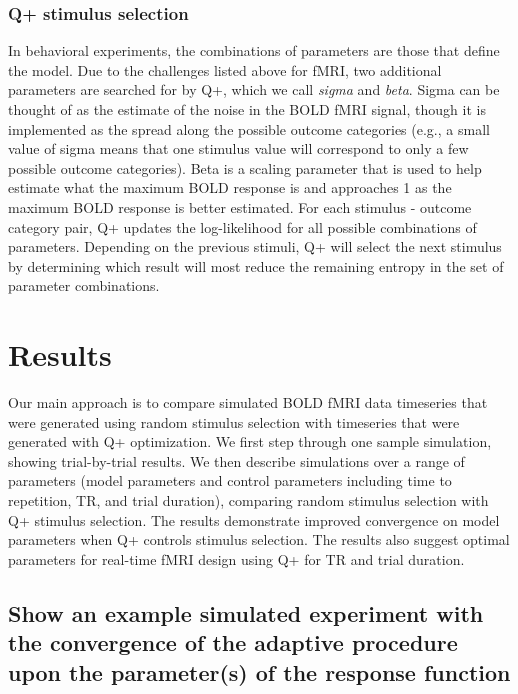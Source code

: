 \documentclass[
  man,floatsintext]{apa6}
\begin{document}
\hypertarget{q-stimulus-selection}{%
\subsubsection{Q+ stimulus selection}\label{q-stimulus-selection}}

In behavioral experiments, the combinations of parameters are those that define the model. Due to the challenges listed above for fMRI, two additional parameters are searched for by Q+, which we call \emph{sigma} and \emph{beta}. Sigma can be thought of as the estimate of the noise in the BOLD fMRI signal, though it is implemented as the spread along the possible outcome categories (e.g., a small value of sigma means that one stimulus value will correspond to only a few possible outcome categories). Beta is a scaling parameter that is used to help estimate what the maximum BOLD response is and approaches 1 as the maximum BOLD response is better estimated.
For each stimulus - outcome category pair, Q+ updates the log-likelihood for all possible combinations of parameters. Depending on the previous stimuli, Q+ will select the next stimulus by determining which result will most reduce the remaining entropy in the set of parameter combinations.

\hypertarget{results}{%
\section{Results}\label{results}}

Our main approach is to compare simulated BOLD fMRI data timeseries that were generated using random stimulus selection with timeseries that were generated with Q+ optimization. We first step through one sample simulation, showing trial-by-trial results. We then describe simulations over a range of parameters (model parameters and control parameters including time to repetition, TR, and trial duration), comparing random stimulus selection with Q+ stimulus selection. The results demonstrate improved convergence on model parameters when Q+ controls stimulus selection. The results also suggest optimal parameters for real-time fMRI design using Q+ for TR and trial duration.

\hypertarget{show-an-example-simulated-experiment-with-the-convergence-of-the-adaptive-procedure-upon-the-parameters-of-the-response-function}{%
\subsection{Show an example simulated experiment with the convergence of the adaptive procedure upon the parameter(s) of the response function}\label{show-an-example-simulated-experiment-with-the-convergence-of-the-adaptive-procedure-upon-the-parameters-of-the-response-function}}
\end{document}

